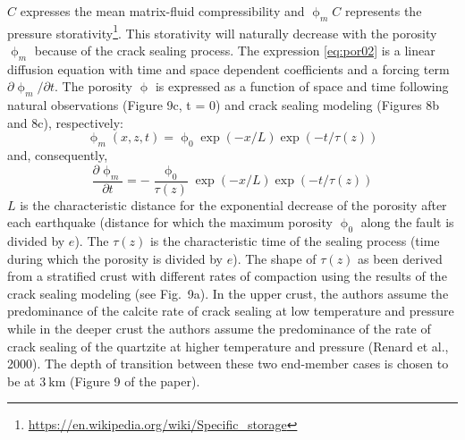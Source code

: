 $C$ expresses the mean matrix-fluid compressibility and $\upphi_m C$ represents the 
pressure storativity\footnote{\url{https://en.wikipedia.org/wiki/Specific_storage}}. 
This storativity will naturally decrease with
the porosity $\upphi_m$ because of the crack sealing process.
The expression \eqref{eq:por02} is a linear diffusion equation
with time and space dependent coefficients and a forcing
term $\partial \upphi_m/\partial t$. The porosity $\upphi$ is expressed as a function of
space and time following natural observations (Figure 9c,
t = 0) and crack sealing modeling (Figures 8b and 8c),
respectively:
\begin{equation}
\upphi_m(x,z,t)=\upphi_0 \exp (-x/L) \exp (-t/\tau(z))
\label{eq:por03}
\end{equation}
and, consequently,
\begin{equation}
\frac{\partial \upphi_m}{\partial t} = -\frac{\upphi_0}{\tau(z)} \exp (-x/L) \exp (-t/\tau(z)) 
\label{eq:por04}
\end{equation}
$L$ is the characteristic distance for the exponential decrease
of the porosity after each earthquake (distance for which the
maximum porosity $\upphi_0$ along the fault is divided by $e$).
The $\tau(z)$ is the characteristic time of the sealing process
(time during which the porosity is divided by $e$). The
shape of $\tau(z)$ as been derived from a stratified crust with
different rates of compaction using the results of the crack
sealing modeling (see Fig.~9a). In the upper crust, the authors
assume the predominance of the calcite rate of crack sealing
at low temperature and pressure while in the deeper crust the authors
assume the predominance of the rate of crack sealing of the
quartzite at higher temperature and pressure (Renard et al., 2000). 
The depth of transition between these two end-member cases 
is chosen to be at $3~\si{\km}$ (Figure 9 of the paper).

